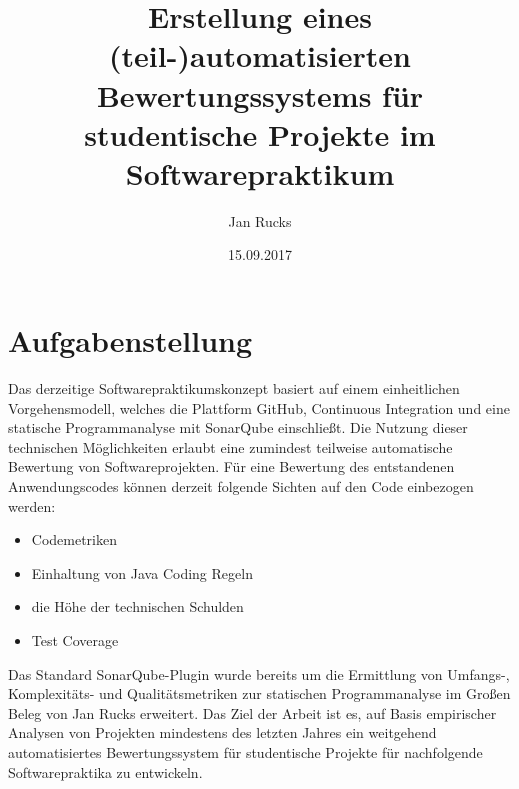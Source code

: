 \documentclass[da,ngerman]{stthesis}
\title{Erstellung eines (teil-)automatisierten \newline
Bewertungssystems für studentische \newline
Projekte im Softwarepraktikum}
\author{Jan Rucks}
\date{15.09.2017}
\begin{document}
	\maketitle 
	\chapter*{Aufgabenstellung}
		Das derzeitige Softwarepraktikumskonzept basiert auf einem einheitlichen Vorgehensmodell, welches die Plattform GitHub, Continuous Integration und eine statische Programmanalyse mit SonarQube einschließt. \newline \newline
		Die Nutzung dieser technischen Möglichkeiten erlaubt eine zumindest teilweise automatische Bewertung von Softwareprojekten. \newline \newline
		Für eine Bewertung des entstandenen Anwendungscodes können derzeit folgende Sichten auf den Code einbezogen werden:
		\begin{itemize}
			\item Codemetriken
			\item Einhaltung von Java Coding Regeln
			\item die Höhe der technischen Schulden
			\item Test Coverage
		\end{itemize} 
		Das Standard SonarQube-Plugin wurde bereits um die Ermittlung von Umfangs-, Komplexitäts- und Qualitätsmetriken zur statischen Programmanalyse im Großen Beleg von Jan Rucks erweitert. \newline \newline
		Das Ziel der Arbeit ist es, auf Basis empirischer Analysen von Projekten mindestens des letzten Jahres ein weitgehend automatisiertes Bewertungssystem für studentische Projekte für nachfolgende Softwarepraktika zu entwickeln.
		
	\tableofcontents
  
\end{document}
